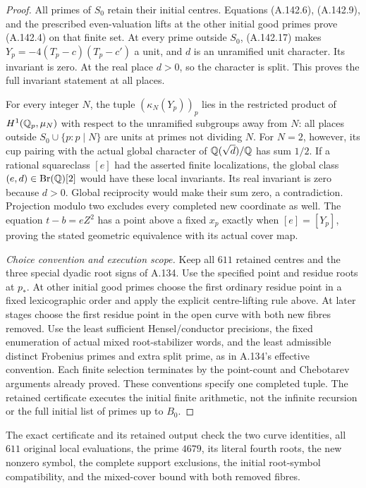 \begin{proof}
All primes of \(S_0\) retain their initial centres.
Equations (A.142.6), (A.142.9), and the prescribed even-valuation
lifts at the other initial good primes prove (A.142.4) on that
finite set.  At every prime outside \(S_0\), (A.142.17) makes
\(Y_p=-4(T_p-c)(T_p-c')\) a unit, and \(d\) is an unramified
unit character.  Its invariant is zero.  At the real place
\(d>0\), so the character is split.  This proves the full
invariant statement at all places.

For every integer \(N\), the tuple
\((\kappa_N(Y_p))_p\) lies in the restricted product of
\(H^1(\mathbb Q_p,\mu_N)\) with respect to the unramified subgroups
away from \(N\): all places outside \(S_0\cup\{p:p\mid N\}\)
are units at primes not dividing \(N\).
For \(N=2\), however, its cup pairing with the actual global
character of \(\mathbb Q(\sqrt d)/\mathbb Q\) has sum \(1/2\).
If a rational squareclass \([e]\) had the asserted finite
localizations, the global class \((e,d)\in\operatorname{Br}(\mathbb Q)[2]\)
would have these local invariants.  Its real invariant is zero
because \(d>0\).  Global reciprocity
\cite[Theorem 12.1.8]{AgentCTSkoro2019} would make their sum zero,
a contradiction.  Projection modulo two excludes every completed
new coordinate as well.
The equation \(t-b=eZ^2\) has a point above a fixed \(x_p\)
exactly when \([e]=[Y_p]\), proving the stated geometric
equivalence with its actual cover map.

\emph{Choice convention and execution scope.}
Keep all \(611\) retained centres and the three special dyadic
root signs of A.134.  Use the specified point and residue roots
at \(p_*\).  At other initial good primes choose the first
ordinary residue point in a fixed lexicographic order and apply
the explicit centre-lifting rule above.  At later stages choose
the first residue point in the open curve with both new fibres
removed.  Use the least sufficient Hensel/conductor precisions,
the fixed enumeration of actual mixed root-stabilizer words,
and the least admissible distinct Frobenius primes and extra
split prime, as in A.134's effective convention.
Each finite selection terminates by the point-count and
Chebotarev arguments already proved.  These conventions specify
one completed tuple.  The retained certificate executes the
initial finite arithmetic, not the infinite recursion or the
full initial list of primes up to \(B_0\).
\end{proof}

The exact certificate
and its retained output check the two curve identities, all
\(611\) original local evaluations, the prime \(4679\), its
literal fourth roots, the new nonzero symbol, the complete
support exclusions, the initial root-symbol compatibility,
and the mixed-cover bound with both removed fibres.
